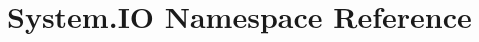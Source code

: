 \hypertarget{namespace_system_1_1_i_o}{}\section{System.\+IO Namespace Reference}
\label{namespace_system_1_1_i_o}
